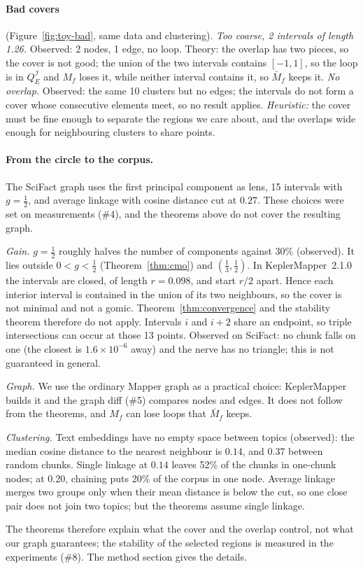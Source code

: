\paragraph{Bad covers} (Figure~\ref{fig:toy-bad}, same data and clustering).
\emph{Too coarse, 2 intervals of length 1.26.} Observed: 2 nodes, 1
edge, no loop. Theory: the overlap has two pieces, so the cover is not
good; the union of the two intervals contains $[-1,1]$, so the loop is in
$Q^{\mathcal I}_E$ and $M_f$ loses it, while neither interval contains
it, so $\bar M_f$ keeps it. \emph{No overlap.} Observed: the same 10
clusters but no edges; the intervals do not form a cover whose
consecutive elements meet, so no result applies. \emph{Heuristic:} the
cover must be fine enough to separate the regions we care about, and the
overlaps wide enough for neighbouring clusters to share points.

\paragraph{From the circle to the corpus.} The SciFact graph uses the
first principal component as lens, 15 intervals with $g=\frac12$, and
average linkage with cosine distance cut at $0.27$. These choices were
set on measurements (\#4), and the theorems above do not cover the
resulting graph.

\emph{Gain.} $g=\frac12$ roughly halves the number of components against
$30\%$ (observed). It lies outside $0<g<\frac12$ (Theorem~\ref{thm:cmo})
and $(\frac13,\frac12)$. In KeplerMapper~2.1.0 the intervals are closed,
of length $r=0.098$, and start $r/2$ apart. Hence each interior interval
is contained in the union of its two neighbours, so the cover is not
minimal and not a gomic. Theorem~\ref{thm:convergence} and the stability
theorem therefore do not apply. Intervals $i$ and $i+2$ share an
endpoint, so triple intersections can occur at those 13 points. Observed on
SciFact: no chunk falls on one (the closest is $1.6\times10^{-6}$ away)
and the nerve has no triangle; this is not guaranteed in general.

\emph{Graph.} We use the ordinary Mapper graph as a practical choice:
KeplerMapper builds it and the graph diff (\#5) compares nodes and edges.
It does not follow from the theorems, and $M_f$ can lose loops that
$\bar M_f$ keeps.

\emph{Clustering.} Text embeddings have no empty space between topics
(observed): the median cosine distance to the nearest neighbour is
$0.14$, and $0.37$ between random chunks. Single linkage at $0.14$
leaves 52\% of the chunks in one-chunk nodes; at $0.20$, chaining puts
20\% of the corpus in one node. Average linkage merges two groups only
when their mean distance is below the cut, so one close pair does not
join two topics; but the theorems assume single linkage.

The theorems therefore explain what the cover and the overlap control,
not what our graph guarantees; the stability of the selected regions is
measured in the experiments (\#8). The method section gives the details.
